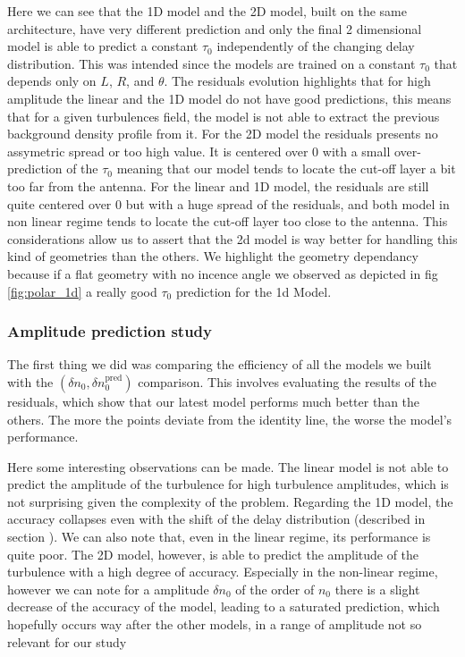 \documentclass[11pt,openany]{report}
\begin{document}
\begin{multicols}{2}
    Here we can see that the 1D model and the 2D model, built on the same architecture, have very different prediction and only the final 2 dimensional model is able to predict a constant \(\tau_0\) independently of the changing delay distribution. This was intended since the models are trained on a constant \(\tau_0\) that depends only on \(L\), \(R\), and \(\theta\). The residuals evolution highlights that for high amplitude the linear and the 1D model do not have good predictions, this means that for a given turbulences field, the model is not able to extract the previous background density profile from it. For the 2D model the residuals presents no assymetric spread or too high value. It is centered over 0 with a small over-prediction of the $\tau_0$ meaning that our model tends to locate the cut-off layer a bit too far from the antenna. For the linear and 1D model, the residuals are still quite centered over 0 but with a huge spread of the residuals, and both model in non linear regime tends to locate the cut-off layer too close to the antenna. This considerations allow us to assert that the 2d model is way better for handling this kind of geometries than the others. We highlight the geometry dependancy because if a flat geometry with no incence angle we observed as depicted in fig \ref{fig:polar_1d} a really good $\tau_0 $ prediction for the 1d Model.

    \subsubsection{Amplitude prediction study}

    The first thing we did was comparing the efficiency of all the models we built with the \((\delta n_0, \delta n_0^{\text{pred}})\) comparison. This involves evaluating the results of the residuals, which show that our latest model performs much better than the others. The more the points deviate from the identity line, the worse the model's performance.

    Here some interesting observations can be made. The linear model is not able to predict the amplitude of the turbulence for high turbulence amplitudes, which is not surprising given the complexity of the problem. Regarding the 1D model, the accuracy collapses even with the shift of the delay distribution (described in section ). We can also note that, even in the linear regime, its performance is quite poor.
    The 2D model, however, is able to predict the amplitude of the turbulence with a high degree of accuracy. Especially in the non-linear regime, however we can note for a amplitude $\delta n_0$ of the order of $n_0$ there is a slight decrease of the accuracy of the model, leading to a saturated prediction, which hopefully occurs way after the other models, in a range of amplitude not so relevant for our study


\end{multicols}
\end{document}
